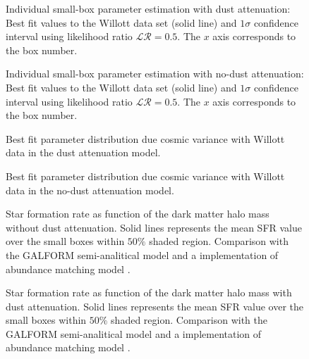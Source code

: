 \documentclass{emulateapj}
\begin{document}
\begin{figure}
\caption{Individual small-box parameter estimation with dust attenuation: Best fit values 
to the Willott data set
(solid line) and $1\sigma$ confidence interval using likelihood ratio $\mathcal{LR}= 0.5$. 
The $x$ axis corresponds to the box number.}
\label{fig:OD1_individual_box_results_w}
\end{figure}


\begin{figure}
\caption{Individual small-box parameter estimation with no-dust attenuation: Best fit values 
to the Willott data set
(solid line) and $1\sigma$ confidence interval using likelihood ratio $\mathcal{LR}= 0.5$. 
The $x$ axis corresponds to the box number.}
\label{fig:OD1_individual_box_results_wo}
\end{figure}


\begin{figure}
\caption{Best fit parameter distribution due cosmic variance with Willott data in the dust
 attenuation model.}
\label{fig:OD1_CosmicVar2_w_dust}
\end{figure}


\begin{figure}
\caption{Best fit parameter distribution due cosmic variance with Willott data in the no-dust
 attenuation model.}
\label{fig:OD1_CosmicVar2_wo_dust}
\end{figure}

\begin{figure}
\caption{Star formation rate as function of the dark matter halo mass without dust attenuation. 
Solid lines represents the mean SFR value over the small boxes within $50\%$  shaded region. 
Comparison with the GALFORM semi-analitical model \citep{Gonzalez14} and a implementation
of abundance matching model \citep{Behroozi13}. }
\label{fig:SFR_DMHM_wo}
\end{figure}

\begin{figure}
\caption{Star formation rate as function of the dark matter halo mass with dust attenuation. 
Solid lines represents the mean SFR value over the small boxes within $50\%$  shaded region.
Comparison with the GALFORM semi-analitical model \citep{Gonzalez14} and a implementation
of abundance matching model \citep{Behroozi13}. }
\label{fig:_SFR_DMHM_w}
\end{figure}
\end{document}
